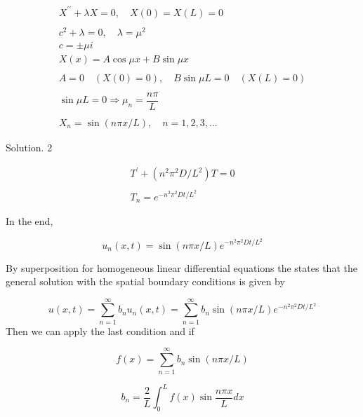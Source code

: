 \documentclass[a4]{article}
\begin{document}
\begin{equation}
\begin{array}{c}
X^{\prime \prime}+\lambda X=0, \quad X(0)=X(L)=0\\
\quad \\
c^{2} + \lambda  = 0, \quad \lambda = \mu^{2}\\
c = \pm \mu i \\


X(x)=A \cos \mu x+B \sin \mu x\\
\quad \\
A = 0\quad (X(0) = 0),\quad B\sin \mu L = 0\quad (X(L) = 0)\\
\quad \\
\sin \mu L = 0\Rightarrow \mu_{n} = \dfrac{n\pi}{L}\\
\quad \\
X_{n}=\sin (n \pi x / L),\quad n = 1,2,3,...
\end{array}
\end{equation}\par 
Solution. 2\par 
\begin{equation}\begin{array}{c}
T^{\prime}+\left(n^{2} \pi^{2} D / L^{2}\right) T=0 \\
\quad \\
T_{n}=e^{-n^{2} \pi^{2} D t / L^{2}}
\end{array}\end{equation}\par 
In the end,\par 
\begin{equation}u_{n}(x, t)=\sin (n \pi x / L) e^{-n^{2} \pi^{2} D t / L^{2}}\end{equation}\par 
By superposition for homogeneous linear differential equations the states that the general solution with the spatial boundary conditions is given by\par 
\begin{equation}u(x, t)=\sum_{n=1}^{\infty} b_{n} u_{n}(x, t)=\sum_{n=1}^{\infty} b_{n} \sin (n \pi x / L) e^{-n^{2} \pi^{2} D t / L^{2}}\end{equation}
Then we can apply the last condition and if\par 

\begin{equation}f(x)=\sum_{n=1}^{\infty} b_{n} \sin (n \pi x / L)\end{equation}

\begin{equation}b_{n}=\frac{2}{L} \int_{0}^{L} f(x) \sin \frac{n \pi x}{L} d x\end{equation}
\end{document}
